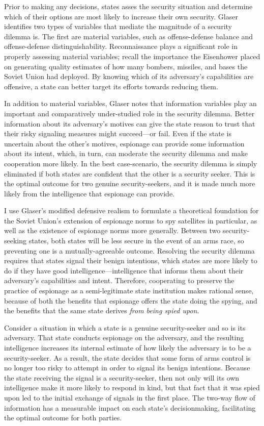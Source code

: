 \documentclass{memoir}
\begin{document}
\begin{refsegment}
Prior to making any decisions, states asses the security situation and determine which of their options are most likely to increase their own security. Glaser identifies two types of variables that mediate the magnitude of a security dilemma is. The first are material variables, such as offense-defense balance and offense-defense distinguishability. Reconnaissance plays a significant role in properly assessing material variables; recall the importance the Eisenhower placed on generating quality estimates of how many bombers, missiles, and bases the Soviet Union had deployed. By knowing which of its adversary's capabilities are offensive, a state can better target its efforts towards reducing them.

In addition to material variables, Glaser notes that information variables play an important and comparatively under-studied role in the security dilemma. Better information about its adversary's motives can give the state reason to trust that their risky signaling measures might succeed---or fail. Even if the state is uncertain about the other's motives, espionage can provide some information about its intent, which, in turn, can moderate the security dilemma and make cooperation more likely. In the best case-scenario, the security dilemma is simply eliminated if both states are confident that the other is a security seeker. This is the optimal outcome for two genuine security-seekers, and it is made much more likely from the intelligence that espionage can provide.

I use Glaser's modified defensive realism to formulate a theoretical foundation for the Soviet Union's extension of espionage norms to spy satellites in particular, as well as the existence of espionage norms more generally. Between two security-seeking states, both states will be less secure in the event of an arms race, so preventing one is a mutually-agreeable outcome. Resolving the security dilemma requires that states signal their benign intentions, which states are more likely to do if they have good intelligence---intelligence that informs them about their adversary's capabilities and intent. Therefore, cooperating to preserve the practice of espionage as a semi-legitimate state institution makes rational sense, because of both the benefits that espionage offers the state doing the spying, and the benefits that the same state derives \emph{from being spied upon}.

Consider a situation in which a state is a genuine security-seeker and so is its adversary. That state conducts espionage on the adversary, and the resulting intelligence increases its internal estimate of how likely the adversary is to be a security-seeker. As a result, the state decides that some form of arms control is no longer too risky to attempt in order to signal its benign intentions. Because the state receiving the signal is a security-seeker, then not only will its own intelligence make it more likely to respond in kind, but that fact that it was spied upon led to the initial exchange of signals in the first place. The two-way flow of information has a measurable impact on each state's decisionmaking, facilitating the optimal outcome for both parties.


\end{refsegment}
\end{document}

